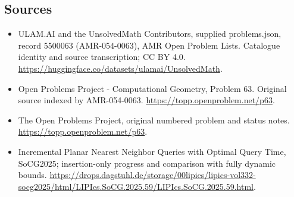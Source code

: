 \documentclass[11pt,a4paper]{article}
\begin{document}
\subsection{Sources}
\begin{itemize}
\item[S1] ULAM.AI and the UnsolvedMath Contributors, supplied problems.json, record 5500063 (AMR-054-0063), AMR Open Problem Lists. Catalogue identity and source transcription; CC BY 4.0.
\url{https://huggingface.co/datasets/ulamai/UnsolvedMath}.
\item[S2] Open Problems Project - Computational Geometry, Problem 63. Original source indexed by AMR-054-0063.
\url{https://topp.openproblem.net/p63}.
\item[S3] The Open Problems Project, original numbered problem and status notes.
\url{https://topp.openproblem.net/p63}.
\item[S4] Incremental Planar Nearest Neighbor Queries with Optimal Query Time, SoCG2025; insertion-only progress and comparison with fully dynamic bounds.
\url{https://drops.dagstuhl.de/storage/00lipics/lipics-vol332-socg2025/html/LIPIcs.SoCG.2025.59/LIPIcs.SoCG.2025.59.html}.
\end{itemize}
\end{document}
